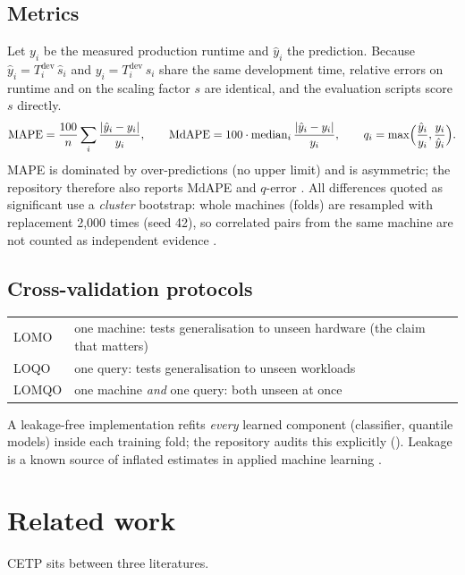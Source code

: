 \subsection{Metrics}\label{sec:metrics}
Let $y_i$ be the measured production runtime and $\hat y_i$ the prediction. Because
$\hat y_i = T^{\text{dev}}_i\,\hat s_i$ and $y_i=T^{\text{dev}}_i\,s_i$ share the same development time,
relative errors on runtime and on the scaling factor $s$ are identical, and the evaluation scripts score
$s$ directly.
\[
\mathrm{MAPE}=\frac{100}{n}\sum_i\frac{|\hat y_i-y_i|}{y_i},\qquad
\text{MdAPE}=100\cdot\operatorname{median}_i\frac{|\hat y_i-y_i|}{y_i},\qquad
q_i=\max\!\Big(\frac{\hat y_i}{y_i},\frac{y_i}{\hat y_i}\Big).
\]
MAPE is dominated by over-predictions (no upper limit) and is asymmetric; the repository therefore also
reports MdAPE and $q$-error \citep{moerkotte:qerror}. All differences quoted as significant use a
\emph{cluster} bootstrap: whole machines (folds) are resampled with replacement 2{,}000 times
(seed 42), so correlated pairs from the same machine are not counted as independent evidence
\citep{efron:bootstrap}.

\subsection{Cross-validation protocols}
\begin{center}\small
\begin{tabularx}{\textwidth}{@{}L{2.4cm}Y@{}}
\toprule {} & \\ \midrule
LOMO & one machine: tests generalisation to unseen hardware (the claim that matters)\\
LOQO & one query: tests generalisation to unseen workloads\\
LOMQO & one machine \emph{and} one query: both unseen at once\\
\bottomrule
\end{tabularx}
\end{center}
A leakage-free implementation refits \emph{every} learned component (classifier, quantile models) inside
each training fold; the repository audits this explicitly ().
Leakage is a known source of inflated estimates in applied machine learning \citep{kaufman:leakage}.

\section{Related work}
CETP sits between three literatures.

